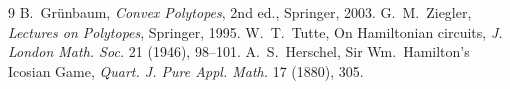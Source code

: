 \documentclass[11pt]{article}
\theoremstyle{definition}
\theoremstyle{remark}
\begin{document}
\begin{thebibliography}{9}
 B.~Gr\"unbaum, \emph{Convex Polytopes}, 2nd ed., Springer, 2003.
 G.~M.~Ziegler, \emph{Lectures on Polytopes}, Springer, 1995.
 W.~T.~Tutte, On Hamiltonian circuits, \emph{J. London Math. Soc.}
21 (1946), 98--101.
 A.~S.~Herschel, Sir Wm.\ Hamilton's Icosian Game,
\emph{Quart. J. Pure Appl. Math.} 17 (1880), 305.
\end{thebibliography}
\end{document}
